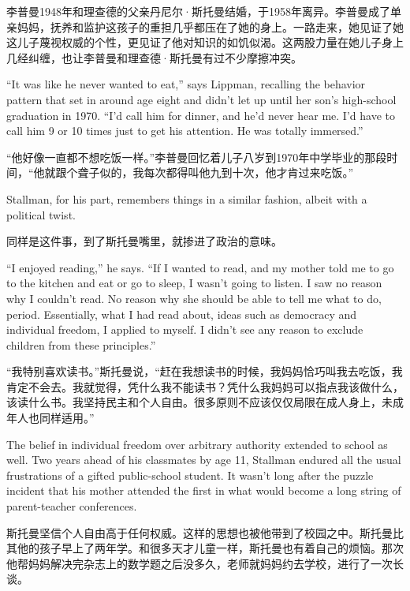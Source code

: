 \ifdefined\chs
李普曼1948年和理查德的父亲丹尼尔·斯托曼结婚，于1958年离异。李普曼成了单亲妈妈，抚养和监护这孩子的重担几乎都压在了她的身上。一路走来，她见证了她这儿子蔑视权威的个性，更见证了他对知识的如饥似渴。这两股力量在她儿子身上几经纠缠，也让李普曼和理查德·斯托曼有过不少摩擦冲突。
\fi

\ifdefined\eng
``It was like he never wanted to eat,'' says Lippman, recalling the behavior pattern that set in around age eight and didn't let up until her son's high-school graduation in 1970. ``I'd call him for dinner, and he'd never hear me. I'd have to call him 9 or 10 times just to get his attention. He was totally immersed.''
\fi

\ifdefined\chs
``他好像一直都不想吃饭一样。''李普曼回忆着儿子八岁到1970年中学毕业的那段时间，``他就跟个聋子似的，我每次都得叫他九到十次，他才肯过来吃饭。''
\fi

\ifdefined\eng
Stallman, for his part, remembers things in a similar fashion, albeit with a political twist.
\fi

\ifdefined\chs
同样是这件事，到了斯托曼嘴里，就掺进了政治的意味。
\fi

\ifdefined\eng
``I enjoyed reading,'' he says. ``If I wanted to read, and my mother told me to go to the kitchen and eat or go to sleep, I wasn't going to listen. I saw no reason why I couldn't read. No reason why she should be able to tell me what to do, period. Essentially, what I had read about, ideas such as democracy and individual freedom, I applied to myself. I didn't see any reason to exclude children from these principles.''
\fi

\ifdefined\chs
``我特别喜欢读书。''斯托曼说，``赶在我想读书的时候，我妈妈恰巧叫我去吃饭，我肯定不会去。我就觉得，凭什么我不能读书？凭什么我妈妈可以指点我该做什么，该读什么书。我坚持民主和个人自由。很多原则不应该仅仅局限在成人身上，未成年人也同样适用。''
\fi

\ifdefined\eng
The belief in individual freedom over arbitrary authority extended to school as well. Two years ahead of his classmates by age 11, Stallman endured all the usual frustrations of a gifted public-school student. It wasn't long after the puzzle incident that his mother attended the first in what would become a long string of parent-teacher conferences.
\fi

\ifdefined\chs
斯托曼坚信个人自由高于任何权威。这样的思想也被他带到了校园之中。斯托曼比其他的孩子早上了两年学。和很多天才儿童一样，斯托曼也有着自己的烦恼。那次他帮妈妈解决完杂志上的数学题之后没多久，老师就妈妈约去学校，进行了一次长谈。
\fi


